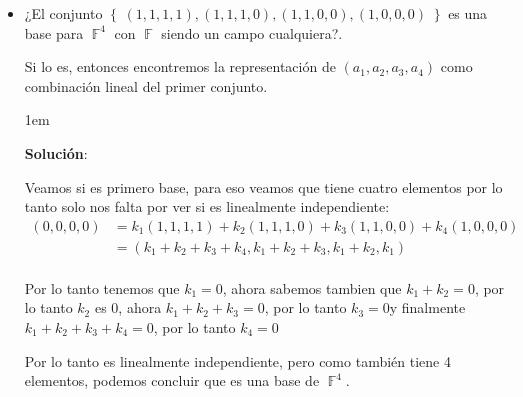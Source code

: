 \documentclass[12pt, fleqn]{report}                             %
\newenvironment{SmallIndentation}[1][0.75em]                    %
        {\begin{adjustwidth}{#1}{}\begin{footnotesize}}             %
        {\end{footnotesize}\end{adjustwidth}}                       %
\theoremstyle{break}                                            %
\DeclareMathOperator \GenericField {\mathbb{F}}                 %
\newcommand{\Set}[1]    {\left\{ \; #1 \; \right\}}             %
\begin{document}
                \begin{itemize}
                    
                    \item 
                        ¿El conjunto $\Set{(1, 1, 1, 1), (1, 1, 1, 0), (1, 1, 0, 0), (1, 0, 0, 0)}$ es una base
                        para $\GenericField^4$ con $\GenericField$ siendo un campo cualquiera?.

                        Si lo es, entonces encontremos la representación de $(a_1, a_2, a_3, a_4)$ como combinación
                        lineal del primer conjunto.

                        \begin{SmallIndentation}[1em]
                            \textbf{Solución}:

                            Veamos si es primero base, para eso veamos que tiene cuatro elementos por lo tanto
                            solo nos falta por ver si es linealmente independiente:
                            \begin{align*}
                                (0, 0, 0, 0)
                                    &= k_1(1, 1, 1, 1) + k_2(1, 1, 1, 0) + k_3(1, 1, 0, 0) + k_4(1, 0, 0, 0)    \\
                                    &= (k_1+k_2+k_3+k_4, k_1+k_2+k_3, k_1+k_2, k_1)                             \\
                            \end{align*}

                            Por lo tanto tenemos que $k_1 = 0$, ahora sabemos tambien que $k_1+k_2 = 0$, por lo tanto $k_2$
                            es $0$, ahora $k_1+k_2+k_3 = 0$, por lo tanto $k_3=0 $y finalmente $k_1+k_2+k_3+k_4 = 0$, por
                            lo tanto $k_4 = 0$

                            Por lo tanto es linealmente independiente, pero como también tiene 4 elementos, podemos concluir que 
                            es una base de $\GenericField^4$.


\end{SmallIndentation}
\end{itemize}
\end{document}
